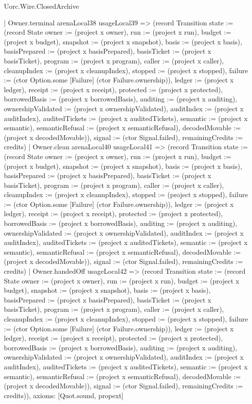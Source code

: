 \begin{lexlean}{Uorc.Wire.ClosedArchive}
\begin{semanticmodule}
{    | Owner.terminal arenaLocal38 usageLocal39 => (record Transition {state := (record State {owner := (project x owner), run := (project x run), budget := (project x budget), snapshot := (project x snapshot), basis := (project x basis), basisPrepared := (project x basisPrepared), basisTicket := (project x basisTicket), program := (project x program), caller := (project x caller), cleanupIndex := (project x cleanupIndex), stopped := (project x stopped), failure := (ctor Option.some [Failure] (ctor Failure.ownership)), ledger := (project x ledger), receipt := (project x receipt), protected := (project x protected), borrowedBasis := (project x borrowedBasis), auditing := (project x auditing), ownershipValidated := (project x ownershipValidated), auditIndex := (project x auditIndex), auditedTickets := (project x auditedTickets), semantic := (project x semantic), semanticRefusal := (project x semanticRefusal), decodedMovable := (project x decodedMovable)}), signal := (ctor Signal.failed), remainingCredits := credits})
    | Owner.clean arenaLocal40 usageLocal41 => (record Transition {state := (record State {owner := (project x owner), run := (project x run), budget := (project x budget), snapshot := (project x snapshot), basis := (project x basis), basisPrepared := (project x basisPrepared), basisTicket := (project x basisTicket), program := (project x program), caller := (project x caller), cleanupIndex := (project x cleanupIndex), stopped := (project x stopped), failure := (ctor Option.some [Failure] (ctor Failure.ownership)), ledger := (project x ledger), receipt := (project x receipt), protected := (project x protected), borrowedBasis := (project x borrowedBasis), auditing := (project x auditing), ownershipValidated := (project x ownershipValidated), auditIndex := (project x auditIndex), auditedTickets := (project x auditedTickets), semantic := (project x semantic), semanticRefusal := (project x semanticRefusal), decodedMovable := (project x decodedMovable)}), signal := (ctor Signal.failed), remainingCredits := credits})
    | Owner.handedOff usageLocal42 => (record Transition {state := (record State {owner := (project x owner), run := (project x run), budget := (project x budget), snapshot := (project x snapshot), basis := (project x basis), basisPrepared := (project x basisPrepared), basisTicket := (project x basisTicket), program := (project x program), caller := (project x caller), cleanupIndex := (project x cleanupIndex), stopped := (project x stopped), failure := (ctor Option.some [Failure] (ctor Failure.ownership)), ledger := (project x ledger), receipt := (project x receipt), protected := (project x protected), borrowedBasis := (project x borrowedBasis), auditing := (project x auditing), ownershipValidated := (project x ownershipValidated), auditIndex := (project x auditIndex), auditedTickets := (project x auditedTickets), semantic := (project x semantic), semanticRefusal := (project x semanticRefusal), decodedMovable := (project x decodedMovable)}), signal := (ctor Signal.failed), remainingCredits := credits})),
  axioms: [Quot.sound, propext]
}


\end{semanticmodule}
\end{lexlean}

